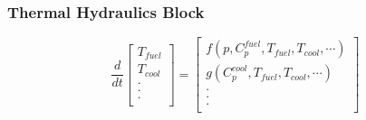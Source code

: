 \begin{frame}[fragile]
  \frametitle{Thermal Hydraulics Block}
  \footnotesize{
  \begin{equation} 
  \frac{d}{dt}\left[
    \begin{array}{c}
      T_{fuel}\\
      T_{cool}\\
      .\\
      .\\
      .\\
    \end{array}
    \right]
    =
    \left[
      \begin{array}{ c }
        f(p, C_p^{fuel}, T_{fuel}, T_{cool},\cdots)\\
        g(C_p^{cool}, T_{fuel}, T_{cool},\cdots)\\
        .\\
        .\\
        .\\
      \end{array}
      \right]
      \label{eqn:th_prke}
    \end{equation}
  
  }
\end{frame}



